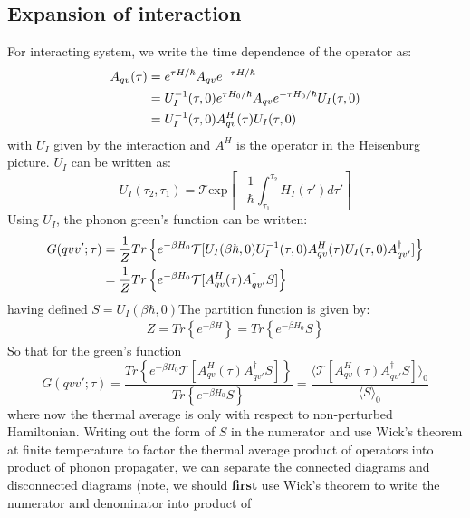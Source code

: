 \documentclass{article}
\begin{document}
\subsection{Expansion of interaction}
For interacting system, we write the time dependence of the operator as:
\begin{align}
    A_{qv}(\tau)&= e^{\tau H/\hbar} A_{qv}  e^{-\tau H/\hbar} \notag \\
                &= U_I^{-1}(\tau,0) e^{\tau H_0/\hbar} A_{qv}  e^{-\tau H_0/\hbar} U_I(\tau,0) \notag \\
                &= U_I^{-1}(\tau,0) A^H_{qv}(\tau)  U_I(\tau,0)
\end{align}
with $U_I$ given by the interaction and $A^H$ is the operator in the Heisenburg picture. $U_I$ can be written as:
\begin{equation}
    U_I(\tau_2, \tau_1) = \mathcal{T} \text{exp} \left[ -\frac{1}{\hbar} \int_{\tau_1}^{\tau_2} H_I(\tau')d\tau' \right]
\end{equation}
Using $U_I$, the phonon green's function can be written:
\begin{align}
    G(qvv';\tau) &= \frac{1}{Z} Tr\left\{ e^{-\beta H_0} \mathcal{T}[ U_I(\beta \hbar,0) U_I^{-1}(\tau,0) A^H_{qv}(\tau)  U_I(\tau,0) A_{qv'}^{\dagger} ] \right\} \notag \\
            &= \frac{1}{Z} Tr\left\{ e^{-\beta H_0} \mathcal{T}[ A^H_{qv}(\tau) A_{qv'}^{\dagger} S ] \right\} 
\end{align}
having defined $S = U_I(\beta\hbar,0)$The partition function is given by:
\begin{align}
    Z = Tr\left\{ e^{-\beta H} \right\} = Tr\left\{ e^{-\beta H_0} S \right\}
\end{align}
So that for the green's function
\begin{equation}
    G(qvv';\tau) = 
    \frac{ Tr\left\{ e^{-\beta H_0} \mathcal{T}\left[ A^H_{qv}(\tau) A_{qv'}^{\dagger} S\right] \right\} }{ Tr\left\{ e^{-\beta H_0} S \right\} }
    = \frac{\langle \mathcal{T}[ A^H_{qv}(\tau) A_{qv'}^{\dagger} S] \rangle_0}{\langle  S \rangle_0}
\end{equation}
where now the thermal average is only with respect to non-perturbed Hamiltonian. 
Writing out the form of $S$ in the numerator and use Wick's theorem at finite temperature to factor the thermal average product of operators into 
product of phonon propagater, we can separate the connected diagrams and disconnected diagrams
(note, we should \textbf{first} use Wick's theorem to write the numerator and denominator into product of
\end{document}
